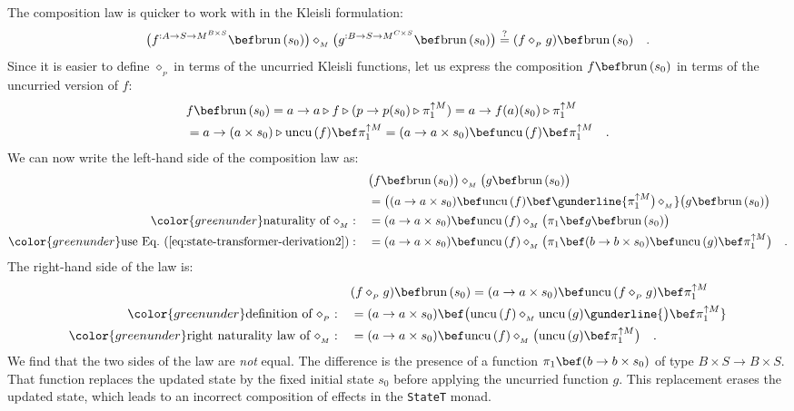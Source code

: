 The composition law is quicker to work with in the Kleisli formulation:
\[
\big(f^{:A\rightarrow S\rightarrow M^{B\times S}}\bef\text{brun}\,(s_{0})\big)\diamond_{_{M}}\big(g^{:B\rightarrow S\rightarrow M^{C\times S}}\bef\text{brun}\,(s_{0})\big)\overset{?}{=}(f\diamond_{_{P}}g)\bef\text{brun}\,(s_{0})\quad.
\]
Since it is easier to define $\diamond_{_{P}}$ in terms of the uncurried
Kleisli functions, let us express the composition $f\bef\text{brun}\,(s_{0})$
in terms of the uncurried version of $f$:
\begin{align}
 & f\bef\text{brun}\,(s_{0})=a\rightarrow a\triangleright f\triangleright(p\rightarrow p(s_{0})\triangleright\pi_{1}^{\uparrow M})=a\rightarrow f(a)(s_{0})\triangleright\pi_{1}^{\uparrow M}\nonumber \\
 & =a\rightarrow(a\times s_{0})\triangleright\text{uncu}\,(f)\bef\pi_{1}^{\uparrow M}=(a\rightarrow a\times s_{0})\bef\text{uncu}\,(f)\bef\pi_{1}^{\uparrow M}\quad.\label{eq:state-transformer-derivation2}
\end{align}
We can now write the left-hand side of the composition law as:
\begin{align*}
 & \big(f\bef\text{brun}\,(s_{0})\big)\diamond_{_{M}}\big(g\bef\text{brun}\,(s_{0})\big)\\
 & =\big((a\rightarrow a\times s_{0})\bef\text{uncu}\,(f)\bef\gunderline{\pi_{1}^{\uparrow M}\big)\,\diamond_{_{M}}}\big(g\bef\text{brun}\,(s_{0})\big)\\
{\color{greenunder}\text{naturality of }\diamond_{_{M}}:}\quad & =(a\rightarrow a\times s_{0})\bef\text{uncu}\,(f)\diamond_{_{M}}\big(\pi_{1}\bef g\bef\text{brun}\,(s_{0})\big)\\
{\color{greenunder}\text{use Eq.~(\ref{eq:state-transformer-derivation2})}:}\quad & =(a\rightarrow a\times s_{0})\bef\text{uncu}\,(f)\diamond_{_{M}}\big(\pi_{1}\bef(b\rightarrow b\times s_{0})\bef\text{uncu}\,(g)\bef\pi_{1}^{\uparrow M}\big)\quad.
\end{align*}
The right-hand side of the law is:
\begin{align*}
 & (f\diamond_{_{P}}g)\bef\text{brun}\,(s_{0})=(a\rightarrow a\times s_{0})\bef\text{uncu}\,(f\diamond_{_{P}}g)\bef\pi_{1}^{\uparrow M}\\
{\color{greenunder}\text{definition of }\diamond_{_{P}}:}\quad & =(a\rightarrow a\times s_{0})\bef\big(\text{uncu}\,(f)\diamond_{_{M}}\text{uncu}\,(g)\gunderline{\big)\bef\pi_{1}^{\uparrow M}}\\
{\color{greenunder}\text{right naturality law of }\diamond_{_{M}}:}\quad & =(a\rightarrow a\times s_{0})\bef\text{uncu}\,(f)\diamond_{_{M}}\big(\text{uncu}\,(g)\bef\pi_{1}^{\uparrow M}\big)\quad.
\end{align*}
We find that the two sides of the law are \emph{not} equal. The difference
is the presence of a function $\pi_{1}\bef(b\rightarrow b\times s_{0})$
of type $B\times S\rightarrow B\times S$. That function replaces
the updated state by the fixed initial state $s_{0}$ before applying
the uncurried function $g$. This replacement erases the updated state,
which leads to an incorrect composition of effects in the \lstinline!StateT!
monad.

